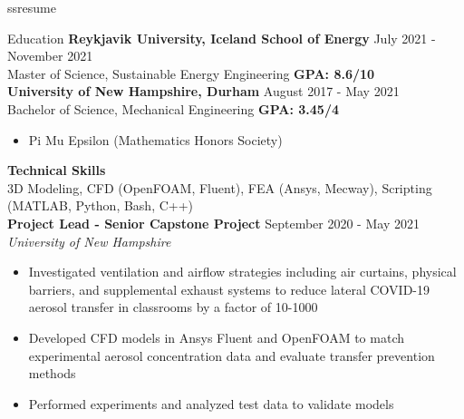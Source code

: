 ss{resume}

\usepackage[top=.25in,bottom=.25in,right=0.3in,left=0.3in]{geometry} %
\usepackage[compact]{titlesec}
\usepackage{enumitem}

\linespread{0.92}
\newcommand{\tab}[1]{\hspace{.1\textwidth}\rlap{#1}}
\newcommand{\itab}[1]{\hspace{0em}\rlap{#1}}
{} %
\address{(603) 727 6428 \\ davisrcole@gmail.com} %
\address{linkedin.com/in/davis-cole17 \\ daveygravy17.myportfolio.com}  %



\begin{rSection}{Education}
    {\bf Reykjavik University, Iceland School of Energy} \hfill {July 2021 - November 2021}
    \\ {Master of Science, Sustainable Energy Engineering} \hfill {\bf{GPA: 8.6/10}}
    \\ {\bf University of New Hampshire, Durham} \hfill {August 2017 - May 2021}
    \\ {Bachelor of Science, Mechanical Engineering} \hfill {\bf GPA: 3.45/4}
    \vspace{-0.5em}
    \begin{itemize}[label={\tiny\raisebox{1ex}{\textbullet}}, noitemsep]
        \item Pi Mu Epsilon (Mathematics Honors Society)
    \end{itemize}{}
    \vspace{-0.4em}
    {\bf Technical Skills}
    \\ 3D Modeling, CFD (OpenFOAM, Fluent), FEA (Ansys, Mecway), Scripting (MATLAB, Python, Bash, C++)
    \\ {\bf Project Lead - Senior Capstone Project} \hfill {September 2020 - May 2021}
    \\ {\em University of New Hampshire}
    \vspace{-0.5em}
    \begin{itemize}[label={\tiny\raisebox{1ex}{\textbullet}}, noitemsep]
        \item Investigated ventilation and airflow strategies including air curtains, physical barriers, and supplemental exhaust systems to reduce lateral COVID-19 aerosol transfer in classrooms by a factor of 10-1000
        \item Developed CFD models in Ansys Fluent and OpenFOAM to match experimental aerosol concentration data and evaluate transfer prevention methods
        \item Performed experiments and analyzed test data to validate models 
    \end{itemize}
    \vspace{-0.4em}
\end{rSection}


